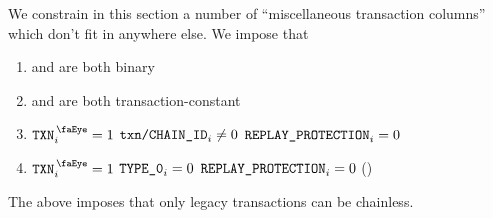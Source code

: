We constrain in this section a number of ``miscellaneous transaction columns'' which don't fit in anywhere else.
We impose that
\begin{enumerate}
    \item \rlpTxnCommonColumnReplayProtection{} and \rlpTxnCommonColumnYparity{} are both binary
    \item \rlpTxnCommonColumnReplayProtection{} and \rlpTxnCommonColumnYparity{} are both transaction-constant
    \item \If $\isTxn _{i} = 1$ \et $\texttt{txn}\texttt{/}\texttt{{CHAIN\_ID}} _{i} \neq 0$ \Then $\texttt{REPLAY\_PROTECTION} _{i} = 0$
    \item \If $\isTxn _{i} = 1$ \et $\texttt{TYPE\_0}                     _{i} =    0$ \Then $\texttt{REPLAY\_PROTECTION} _{i} = 0$ \quad (\sanityCheck)
\end{enumerate}
\saNote{} \label{rlp txn v2: generalities: transaction decoding: non legacy transaction can't be chainless}
The above imposes that only legacy transactions can be chainless.
